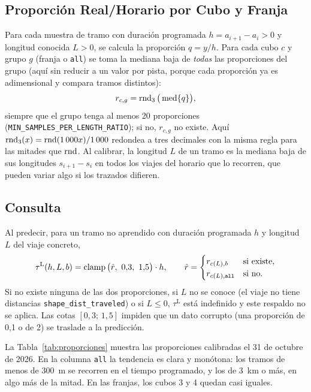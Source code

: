 \subsection{Proporción Real/Horario por Cubo y Franja}

Para cada muestra de tramo con duración programada $h=a_{i+1}-a_i>0$ y longitud conocida $L>0$, se calcula la
proporción $q=y/h$. Para cada cubo $c$ y grupo $g$ (franja o \texttt{all}) se toma la mediana baja de \emph{todas} las
proporciones del grupo (aquí sin reducir a un valor por pista, porque cada proporción ya es adimensional y compara
tramos distintos):
\begin{equation}
\label{eq:proporcion}
r_{c,g}=\operatorname{rnd}_3\big(\operatorname{med}\{q\}\big),
\end{equation}
siempre que el grupo tenga al menos 20 proporciones (\texttt{MIN\_SAMPLES\_PER\_LENGTH\_RATIO}); si no, $r_{c,g}$ no
existe. Aquí $\operatorname{rnd}_3(x)=\operatorname{rnd}(1\,000x)/1\,000$ redondea a tres decimales con la misma regla para las mitades
que $\operatorname{rnd}$. Al calibrar, la longitud $L$ de un tramo es la mediana baja de sus longitudes $s_{i+1}-s_i$ en todos
los viajes del horario que lo recorren, que pueden variar algo si los trazados difieren.

\subsection{Consulta}

Al predecir, para un tramo no aprendido con duración programada $h$ y longitud $L$ del viaje concreto,
\begin{equation}
\label{eq:respaldo}
\tau^{\mathrm{L}}(h,L,b)=\operatorname{clamp}\big(\hat r,\ 0{,}3,\ 1{,}5\big)\cdot h,\qquad
\hat r=\begin{cases}
r_{c(L),b} & \text{si existe},\\
r_{c(L),\texttt{all}} & \text{si no.}
\end{cases}
\end{equation}
Si no existe ninguna de las dos proporciones, si $L$ no se conoce (el viaje no tiene distancias
\texttt{shape\_dist\_traveled}) o si $L\le0$, $\tau^{\mathrm{L}}$ está indefinido y este respaldo no se aplica. Las
cotas $[0{,}3;\,1{,}5]$ impiden que un dato corrupto (una proporción de 0,1 o de 2) se traslade a la predicción.

La Tabla~\ref{tab:proporciones} muestra las proporciones calibradas el 31 de octubre de 2026. En la columna
\texttt{all} la tendencia es clara y monótona: los tramos de menos de 300~m se recorren en el tiempo programado, y los
de 3~km o más, en algo más de la mitad. En las franjas, los cubos 3 y 4 quedan casi iguales.

